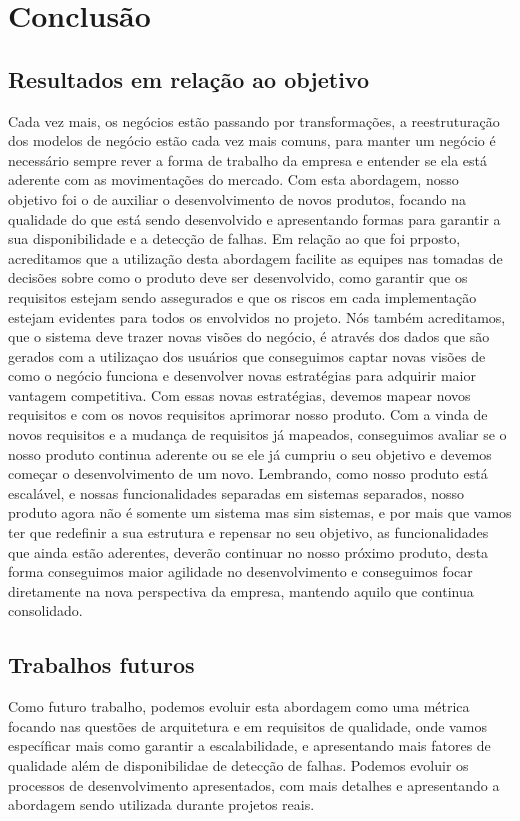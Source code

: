 \part{Conclusão}
  \chapter{Resultados em relação ao objetivo}
    Cada vez mais, os negócios estão passando por transformações, a reestruturação
    dos modelos de negócio estão cada vez mais comuns, para manter um negócio é
    necessário sempre rever a forma de trabalho da empresa e entender se ela está
    aderente com as movimentações do mercado. \newline
    Com esta abordagem, nosso objetivo foi o de auxiliar o desenvolvimento de novos
    produtos, focando na qualidade do que está sendo desenvolvido e apresentando
    formas para garantir a sua disponibilidade e a detecção de falhas. Em relação
    ao que foi prposto, acreditamos que a utilização desta abordagem facilite as
    equipes nas tomadas de decisões sobre como o produto deve ser desenvolvido,
    como garantir que os requisitos estejam sendo assegurados e que os riscos em
    cada implementação estejam evidentes para todos os envolvidos no projeto.\newline
    Nós também acreditamos, que o sistema deve trazer novas visões do negócio, é
    através dos dados que são gerados com a utilizaçao dos usuários que conseguimos
    captar novas visões de como o negócio funciona e desenvolver novas estratégias
    para adquirir maior vantagem competitiva. Com essas novas estratégias, devemos
    mapear novos requisitos e com os novos requisitos aprimorar nosso produto. \newline
    Com a vinda de novos requisitos e a mudança de requisitos já mapeados, conseguimos
    avaliar se o nosso produto continua aderente ou se ele já cumpriu o seu objetivo
    e devemos começar o desenvolvimento de um novo. Lembrando, como nosso produto
    está escalável, e nossas funcionalidades separadas em sistemas separados, nosso
    produto agora não é somente um sistema mas sim sistemas, e por mais que vamos
    ter que redefinir a sua estrutura e repensar no seu objetivo, as funcionalidades
    que ainda estão aderentes, deverão continuar no nosso próximo produto, desta
    forma conseguimos maior agilidade no desenvolvimento e conseguimos focar
    diretamente na nova perspectiva da empresa, mantendo aquilo que continua
    consolidado.

  \chapter{Trabalhos futuros}
    Como futuro trabalho, podemos evoluir esta abordagem como uma métrica focando
    nas questões de arquitetura e em requisitos de qualidade, onde vamos específicar
    mais como garantir a escalabilidade, e apresentando mais fatores de qualidade
    além de disponibilidae de detecção de falhas. Podemos evoluir os processos de
    desenvolvimento apresentados, com mais detalhes e apresentando a abordagem sendo
    utilizada durante projetos reais.
